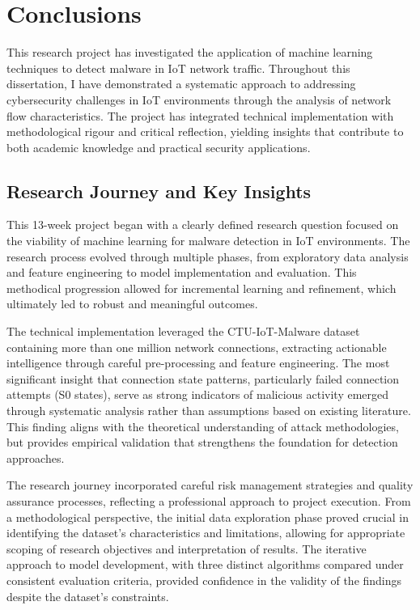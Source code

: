 \chapter{Conclusions}

This research project has investigated the application of machine learning techniques to detect malware in IoT network traffic. Throughout this dissertation, I have demonstrated a systematic approach to addressing cybersecurity challenges in IoT environments through the analysis of network flow characteristics. The project has integrated technical implementation with methodological rigour and critical reflection, yielding insights that contribute to both academic knowledge and practical security applications.

\section{Research Journey and Key Insights}

This 13-week project began with a clearly defined research question focused on the viability of machine learning for malware detection in IoT environments. The research process evolved through multiple phases, from exploratory data analysis and feature engineering to model implementation and evaluation. This methodical progression allowed for incremental learning and refinement, which ultimately led to robust and meaningful outcomes.

The technical implementation leveraged the CTU-IoT-Malware dataset containing more than one million network connections, extracting actionable intelligence through careful pre-processing and feature engineering. The most significant insight that connection state patterns, particularly failed connection attempts (S0 states), serve as strong indicators of malicious activity emerged through systematic analysis rather than assumptions based on existing literature. This finding aligns with the theoretical understanding of attack methodologies, but provides empirical validation that strengthens the foundation for detection approaches.

The research journey incorporated careful risk management strategies and quality assurance processes, reflecting a professional approach to project execution. From a methodological perspective, the initial data exploration phase proved crucial in identifying the dataset's characteristics and limitations, allowing for appropriate scoping of research objectives and interpretation of results. The iterative approach to model development, with three distinct algorithms compared under consistent evaluation criteria, provided confidence in the validity of the findings despite the dataset's constraints.

